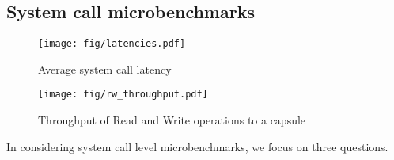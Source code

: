


\subsection{System call microbenchmarks}


\begin{figure}[t]
  \texttt{[image: fig/latencies.pdf]}
  \caption{Average system call latency}
  \label{fig:latencies}
\end{figure}

\begin{figure}[t]
  \texttt{[image: fig/rw\_throughput.pdf]}
  \caption{Throughput of Read and Write operations to a capsule}
  \label{fig:rw_throughput}
\end{figure}


In considering system call level microbenchmarks, we focus on three
questions.\\

